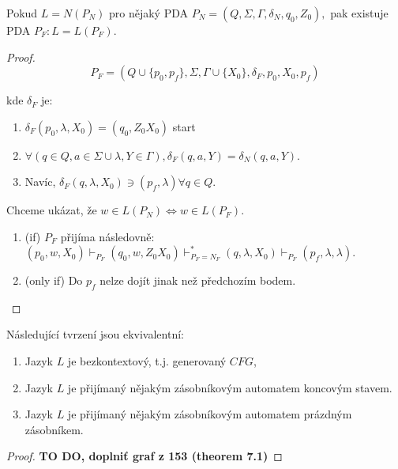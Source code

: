 \documentclass[../main.tex]{subfiles}
\begin{document}
    \begin{theorem}
        Pokud $L = N(P_N)$ pro nějaký PDA $P_N = (Q,\Sigma, \Gamma, \delta_N, q_0, Z_0),$ pak existuje PDA $P_F : L = L(P_F)$.
        
        \begin{proof}
            \[P_F = (Q\cup \{p_0,p_f\},\Sigma, \Gamma \cup \{X_0\}, \delta_F, p_0, X_0, {p_f})\]

            kde $\delta_F$ je:
            \begin{enumerate}
                \item $\delta_F(p_0, \lambda, X_0) = {(q_0,Z_0 X_0)}$ start
                \item $\forall (q\in Q, a \in \Sigma \cup {\lambda}, Y \in \Gamma), \delta_F(q,a,Y) = \delta_N(q,a,Y)$.
                \item Navíc, $\delta_F(q,\lambda, X_0) \ni (p_f, \lambda) \forall q\in Q$. 
            \end{enumerate}
            Chceme ukázat, že $w \in L(P_N) \Leftrightarrow w \in L(P_F)$.
            \begin{enumerate}
                \item (if) $P_F$ přijíma následovně:
                $(p_0, w, X_0) \vdash_{P_F}(q_0,w,Z_0 X_0)\vdash^*_{P_F=N_F}
                (q,\lambda, X_0) \vdash_{P_F}(p_f,\lambda,\lambda).$
                \item (only if) Do $p_f$ nelze dojít jinak než předchozím bodem.
            \end{enumerate}
        \end{proof}
    \end{theorem}

    \begin{theorem}
        Následující tvrzení jsou ekvivalentní:
        \begin{enumerate}
            \item Jazyk $L$ je bezkontextový, t.j. generovaný $CFG$,
            \item Jazyk $L$ je přijímaný nějakým zásobníkovým automatem koncovým stavem.
            \item Jazyk $L$ je přijímaný nějakým zásobníkovým automatem prázdným zásobníkem.
        \end{enumerate}
    \end{theorem}
    \begin{proof}
        \textbf{TO DO, doplniť graf z 153 (theorem 7.1)}    
    \end{proof}
\end{document}
